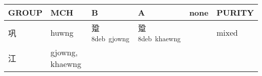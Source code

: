\documentclass[14pt,a4paper]{scrartcl}
\begin{document}
\begin{longtable}[c]{@{}llllll@{}}
\toprule
\begin{minipage}[b]{0.14\columnwidth}\raggedright\strut
GROUP
\strut\end{minipage} &
\begin{minipage}[b]{0.14\columnwidth}\raggedright\strut
MCH
\strut\end{minipage} &
\begin{minipage}[b]{0.14\columnwidth}\raggedright\strut
B
\strut\end{minipage} &
\begin{minipage}[b]{0.14\columnwidth}\raggedright\strut
A
\strut\end{minipage} &
\begin{minipage}[b]{0.14\columnwidth}\raggedright\strut
none
\strut\end{minipage} &
\begin{minipage}[b]{0.14\columnwidth}\raggedright\strut
PURITY
\strut\end{minipage}\tabularnewline
\midrule
\endhead
\begin{minipage}[t]{0.14\columnwidth}\raggedright\strut
巩
\strut\end{minipage} &
\begin{minipage}[t]{0.14\columnwidth}\raggedright\strut
huwng
\strut\end{minipage} &
\begin{minipage}[t]{0.14\columnwidth}\raggedright\strut
跫\textsuperscript{8deb~gjowng}
\strut\end{minipage} &
\begin{minipage}[t]{0.14\columnwidth}\raggedright\strut
跫\textsuperscript{8deb~khaewng}
\strut\end{minipage} &
\begin{minipage}[t]{0.14\columnwidth}\raggedright\strut
\strut\end{minipage} &
\begin{minipage}[t]{0.14\columnwidth}\raggedright\strut
mixed
\strut\end{minipage}\tabularnewline
\begin{minipage}[t]{0.14\columnwidth}\raggedright\strut
江
\strut\end{minipage} &
\begin{minipage}[t]{0.14\columnwidth}\raggedright\strut
gjowng, khaewng
\strut\end{minipage} &
\begin{minipage}[t]{0.14\columnwidth}\raggedright\strut
\strut\end{minipage} &

\end{longtable}
\end{document}
